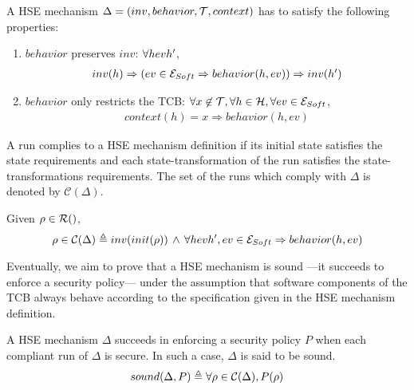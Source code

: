   \begin{definition}
    \label{def:laws}
    A HSE mechanism $\Delta = (inv, behavior, \mathcal{T}, context)$ has to satisfy
    the following properties:
    \begin{enumerate}
    \item $behavior$ preserves $inv$: $\forall \transitionLTS{Ez}{h}{ev}{h'}$,
      \[ \begin{array}{l} inv(h) \Rightarrow (ev \in \mathcal{E}_{Soft} \Rightarrow
          behavior(h,ev)) \Rightarrow inv(h')
         \end{array}
       \]
     \item $behavior$ only restricts the TCB:
       $\forall x \not\in \mathcal{T}, \forall h \in \mathcal{H}, \forall ev \in
       \mathcal{E}_{Soft}$,
       \[
         \begin{array}{l}
           context(h) = x \Rightarrow behavior(h, ev)
         \end{array}
       \]
     \end{enumerate}
   \end{definition}

   A run complies to a HSE mechanism definition if its initial state satisfies
   the state requirements and each state-transformation of the run satisfies the
   state-transformations requirements. The set of the runs which comply with
   $\Delta$ is denoted by $\mathcal{C}(\Delta)$.

\begin{definition}
  Given $\rho \in \pathesLTS{Ez}$,
  \[ \rho \in \mathcal{C}(\Delta) \triangleq inv(init(\rho))\,\wedge\,\forall
    \transitionLTS{Ez}{h}{ev}{h'}, ev \in \set{E}_{Soft} \Rightarrow
    behavior(h,ev) \]
\end{definition}

Eventually, we aim to prove that a HSE mechanism is sound \mbox{---it} succeeds
to enforce a security policy--- under the assumption that software components of
the TCB always behave according to the specification given in the HSE mechanism
definition.

\begin{definition}
  \label{def:sound}
  A HSE mechanism $\Delta$ succeeds in enforcing a security policy $P$ when each
  compliant run of $\Delta$ is secure. In such a case, $\Delta$ is said to be
  sound.
  \[ sound(\Delta, P) \triangleq \forall \rho \in \mathcal{C}(\Delta), P(\rho)
  \]
\end{definition}

